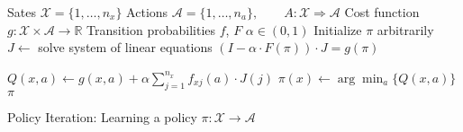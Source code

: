 \documentclass{article}
\begin{document}
\begin{preview}
    \begin{algorithm}[H]
        \begin{algorithmic}
        \Require
        \Statex Sates $\mathcal{X} = \{1, \dots, n_x\}$
        \Statex Actions $\mathcal{A} = \{1, \dots, n_a\},\qquad A: \mathcal{X} \Rightarrow \mathcal{A}$
        \Statex Cost function $g: \mathcal{X} \times \mathcal{A} \rightarrow \mathbb{R}$
        \Statex Transition probabilities $f$, $F$
        \Statex $\alpha \in (0, 1)$
            \State Initialize $\pi$ arbitrarily
                \State $J \gets$ solve system of linear equations $(I - \alpha \cdot F(\pi)) \cdot J = g(\pi)$

                        \State $Q(x, a) \gets g(x, a) + \alpha \sum_{j=1}^{n_x} f_{xj}(a) \cdot J(j)$
                    \EndFor
                \EndFor
                    \State $\pi(x) \gets \arg \min_a \{Q(x, a)\}$
                \EndFor
            \EndWhile
            \Return $\pi$
        \EndProcedure
        \end{algorithmic}
    \caption{Policy Iteration: Learning a policy $\pi: \mathcal{X} \rightarrow \mathcal{A}$}
    \label{alg:policy-iteration}
    \end{algorithm}
\end{preview}
\end{document}

